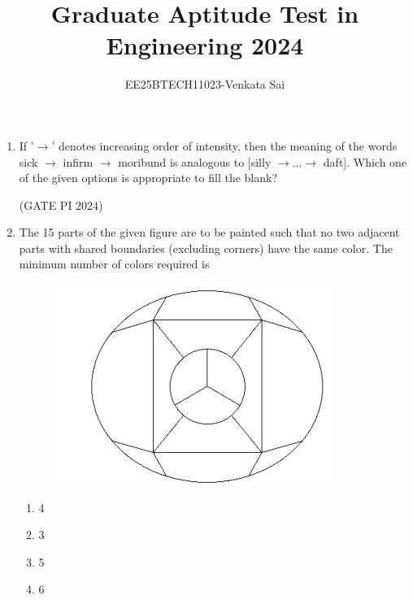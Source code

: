\documentclass[journal,12pt,onecolumn]{IEEEtran}
\title{Graduate Aptitude Test in Engineering 2024}
\author{EE25BTECH11023-Venkata Sai}
\theoremstyle{remark}
\begin{document}
\noindent
\maketitle

\begin{enumerate}
\item If '$\rightarrow$' denotes increasing order of intensity, then the meaning of the words {sick $\rightarrow$ infirm $\rightarrow$ moribund} is analogous to [silly $\rightarrow \dots \rightarrow$ daft]. Which one of the given options is appropriate to fill the blank?
\begin{enumerate}
\end{enumerate}

\hfill (GATE PI 2024)

\item The 15 parts of the given figure are to be painted such that no two adjacent parts with shared boundaries (excluding corners) have the same color. The minimum number of colors required is

\begin{figure}[h]
    \centering
    \includegraphics[width=0.5\columnwidth]{figs/fig1.png}
    \caption{}
    \label{fig:placeholder}
\end{figure} 
\begin{multicols}{4}
\begin{enumerate}
    \item 4
    \item 3
    \item 5
    \item 6
\end{enumerate}
\end{multicols}


\end{enumerate}
\end{document}
